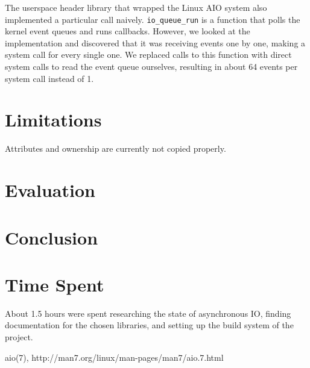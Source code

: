 \documentclass[11pt]{article}
\begin{document}
The userspace header library that wrapped the Linux AIO system also implemented a particular call naively. \texttt{io\_queue\_run} is a function that polls the kernel event queues and runs callbacks. However, we looked at the implementation and discovered that it was receiving events one by one, making a system call for every single one. We replaced calls to this function with direct system calls to read the event queue ourselves, resulting in about 64 events per system call instead of 1.

\section{Limitations}
Attributes and ownership are currently not copied properly.

\section{Evaluation}

\section{Conclusion}

\section{Time Spent}
About 1.5 hours were spent researching the state of asynchronous IO, finding documentation for the chosen libraries, and setting up the build system of the project.

\begin{thebibliography}{99}
	aio(7), http://man7.org/linux/man-pages/man7/aio.7.html
\end{thebibliography}
\end{document}
